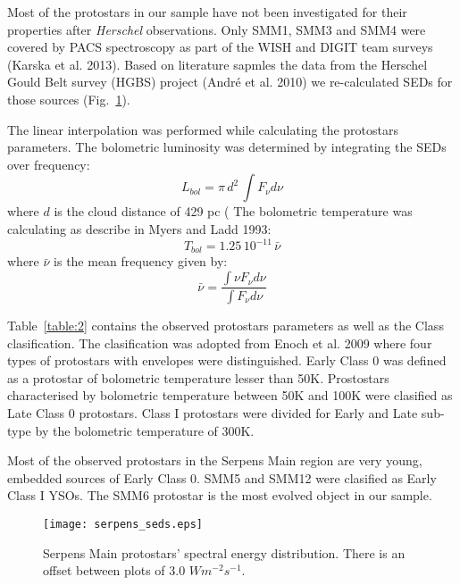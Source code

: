 \documentclass{aa}
\begin{document}
Most of the protostars in our sample have not been investigated for their properties after \textit{Herschel} observations. Only SMM1, SMM3 and SMM4 were covered by PACS spectroscopy as part of the WISH and DIGIT team surveys (Karska et al. 2013). Based on literature sapmles the data from the Herschel Gould Belt survey (HGBS) project (André et al. 2010) we re-calculated SEDs for those sources (Fig.~\ref{seds}).

The linear interpolation was performed while calculating the protostars parameters. The bolometric luminosity was determined by integrating the SEDs over frequency:
\begin{equation} \label{eq1}
L_{bol} = \pi \, d^2 \, \int F_\nu d\nu
\end{equation}
where $d$ is the cloud distance of 429 pc (
The bolometric temperature was calculating as describe in Myers and Ladd 1993:
\begin{equation} \label{eq2}
T_{bol} = 1.25 \, 10^{-11} \, \bar{\nu}
\end{equation}
where $\bar{\nu}$ is the mean frequency given by:
\begin{equation} \label{eq3}
\bar{\nu} = \frac{\int \nu F_\nu d\nu}{ \int F_\nu d\nu}
\end{equation}

Table~\ref{table:2} contains the observed protostars parameters as well as the Class clasification. The clasification was adopted from Enoch et al. 2009 where four types of protostars with envelopes were distinguished. Early Class 0 was defined as a protostar of bolometric temperature lesser than 50K. Prostostars characterised by bolometric temperature between 50K and 100K were clasified as Late Class 0 protostars. Class I protostars were divided for Early and Late sub-type by the bolometric temperature of 300K.

Most of the observed protostars in the Serpens Main region are very young, embedded sources of Early Class 0. SMM5 and SMM12 were clasified as Early Class I YSOs. The SMM6 protostar is the most evolved object in our sample. 

\begin{figure}
   \texttt{[image: serpens\_seds.eps]}
      \caption{Serpens Main protostars' spectral energy distribution. There is an offset between plots of 3.0 $W m^{-2} s^{-1}$.}
         \label{seds}
   \end{figure}
\end{document}
